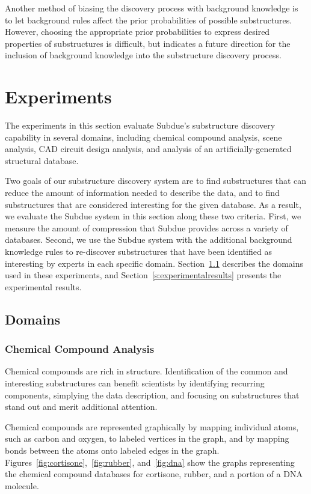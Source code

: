 Another method of biasing the discovery process with background knowledge
is to let background rules affect the prior probabilities of possible
substructures.  However, choosing the appropriate prior probabilities to
express desired properties of substructures is difficult, but indicates
a future direction for the inclusion of background knowledge into the
substructure discovery process.

\section{Experiments}
\label{s:exps}

The experiments in this section evaluate {\sc Subdue}'s substructure
discovery capability in several domains, including chemical compound
analysis, scene analysis, CAD circuit design analysis, and analysis of
an artificially-generated structural database.

Two goals of our substructure discovery system are to find substructures that
can reduce the amount of information needed to describe the data, and to
find substructures that are considered interesting for the given database.
As a result, we evaluate the {\sc Subdue} system in this section along these
two criteria.  First, we measure the amount of compression that {\sc Subdue}
provides across a variety of databases.  Second, we use the {\sc Subdue} system
with the additional background knowledge rules
to re-discover substructures that have been
identified as interesting by experts in each specific domain.
Section~\ref{s:domains} describes the domains used in these experiments, and
Section~\ref{s:experimentalresults} presents the experimental results.

\subsection{Domains}
\label{s:domains}

\subsubsection{Chemical Compound Analysis}

Chemical compounds are rich in structure.  Identification
of the common and interesting substructures can benefit scientists by
identifying recurring components, simplying the data description, and focusing
on substructures that stand out and merit additional attention.

Chemical compounds are represented graphically by mapping
individual atoms, such as carbon and oxygen, to labeled vertices in the graph,
and by mapping bonds between the atoms onto labeled edges in the graph.
Figures~\ref{fig:cortisone},~\ref{fig:rubber}, and~\ref{fig:dna} show the
graphs representing the chemical compound databases for cortisone, rubber,
and a portion of a {\sc DNA} molecule.

